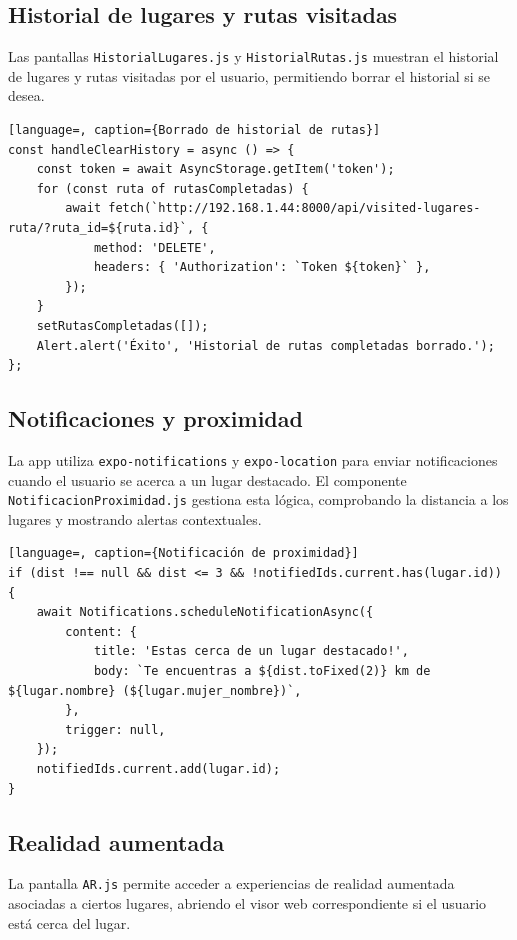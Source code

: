 \subsection{Historial de lugares y rutas visitadas}

Las pantallas \texttt{HistorialLugares.js} y \texttt{HistorialRutas.js} muestran el historial de lugares y rutas visitadas por el usuario, permitiendo borrar el historial si se desea.

\begin{lstlisting}[language=, caption={Borrado de historial de rutas}]
const handleClearHistory = async () => {
    const token = await AsyncStorage.getItem('token');
    for (const ruta of rutasCompletadas) {
        await fetch(`http://192.168.1.44:8000/api/visited-lugares-ruta/?ruta_id=${ruta.id}`, {
            method: 'DELETE',
            headers: { 'Authorization': `Token ${token}` },
        });
    }
    setRutasCompletadas([]);
    Alert.alert('Éxito', 'Historial de rutas completadas borrado.');
};
\end{lstlisting}

\subsection{Notificaciones y proximidad}

La app utiliza \texttt{expo-notifications} y \texttt{expo-location} para enviar notificaciones cuando el usuario se acerca a un lugar destacado. El componente \texttt{NotificacionProximidad.js} gestiona esta lógica, comprobando la distancia a los lugares y mostrando alertas contextuales.

\begin{lstlisting}[language=, caption={Notificación de proximidad}]
if (dist !== null && dist <= 3 && !notifiedIds.current.has(lugar.id)) {
    await Notifications.scheduleNotificationAsync({
        content: {
            title: 'Estas cerca de un lugar destacado!',
            body: `Te encuentras a ${dist.toFixed(2)} km de ${lugar.nombre} (${lugar.mujer_nombre})`,
        },
        trigger: null,
    });
    notifiedIds.current.add(lugar.id);
}
\end{lstlisting}

\subsection{Realidad aumentada}

La pantalla \texttt{AR.js} permite acceder a experiencias de realidad aumentada asociadas a ciertos lugares, abriendo el visor web correspondiente si el usuario está cerca del lugar.

